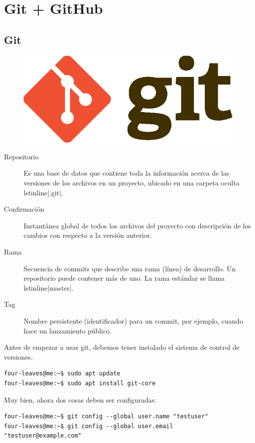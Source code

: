 \chapter{Git + GitHub}

\section{Git}

\lipsum[1]
\begin{figure}
	\includegraphics[width=0.24\paperwidth]{./img/git}
\end{figure}
\lipsum[1]

\begin{description}
	\item[Repositorio] Es una base de datos que contiene toda la información acerca de las versiones de los archivos en un proyecto, ubicado en una carpeta oculta lstinline|.git|.
	\item[Confirmación] Instantánea global de todos los archivos del proyecto con descripción de los cambios con respecto a la versión anterior.
	\item[Rama] Secuencia de commits que describe una rama (línea) de desarrollo. Un repositorio puede contener más de uno. La rama estándar se llama lstinline|master|.
	\item[Tag] Nombre persistente (identificador) para un commit, por ejemplo, cuando hace un lanzamiento público.
\end{description}

Antes de empezar a usar git, debemos tener instalado el sistema de control de versiones.
\begin{lstlisting}
four-leaves@me:~$ sudo apt update
four-leaves@me:~$ sudo apt install git-core
\end{lstlisting}
Muy bien, ahora dos cosas deben ser configuradas:
\begin{lstlisting}
four-leaves@me:~$ git config --global user.name "testuser"
four-leaves@me:~$ git config --global user.email "testuser@example.com"
\end{lstlisting}

